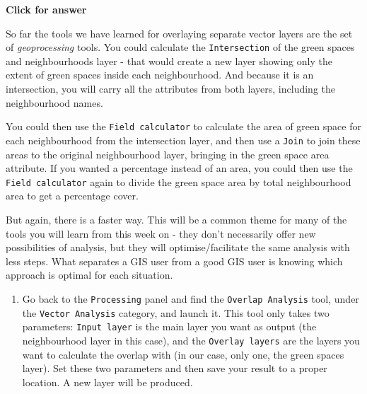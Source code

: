 \documentclass[
  letterpaper,
  DIV=11,
  numbers=noendperiod]{scrreprt}
\providecommand{\tightlist}{%
  \setlength{\itemsep}{0pt}\setlength{\parskip}{0pt}}\usepackage{longtable,booktabs,array}
\begin{document}
\begin{tcolorbox}[enhanced jigsaw, leftrule=.75mm, colframe=quarto-callout-important-color-frame, breakable, toprule=.15mm, bottomrule=.15mm, arc=.35mm, rightrule=.15mm, opacityback=0, colback=white, left=2mm]

\vspace{-3mm}\textbf{Click for answer}\vspace{3mm}

So far the tools we have learned for overlaying separate vector layers
are the set of \emph{geoprocessing} tools. You could calculate the
\texttt{Intersection} of the green spaces and neighbourhoods layer -
that would create a new layer showing only the extent of green spaces
inside each neighbourhood. And because it is an intersection, you will
carry all the attributes from both layers, including the neighbourhood
names.

You could then use the \texttt{Field\ calculator} to calculate the area
of green space for each neighbourhood from the intersection layer, and
then use a \texttt{Join} to join these areas to the original
neighbourhood layer, bringing in the green space area attribute. If you
wanted a percentage instead of an area, you could then use the
\texttt{Field\ calculator} again to divide the green space area by total
neighbourhood area to get a percentage cover.

But again, there is a faster way. This will be a common theme for many
of the tools you will learn from this week on - they don't necessarily
offer new possibilities of analysis, but they will optimise/facilitate
the same analysis with less steps. What separates a GIS user from a good
GIS user is knowing which approach is optimal for each situation.

\end{tcolorbox}

\begin{enumerate}
\def\labelenumi{(\arabic{enumi})}
\setcounter{enumi}{329}
\tightlist
\item
  Go back to the \texttt{Processing} panel and find the
  \texttt{Overlap\ Analysis} tool, under the \texttt{Vector\ Analysis}
  category, and launch it. This tool only takes two parameters:
  \texttt{Input\ layer} is the main layer you want as output (the
  neighbourhood layer in this case), and the \texttt{Overlay\ layers}
  are the layers you want to calculate the overlap with (in our case,
  only one, the green spaces layer). Set these two parameters and then
  save your result to a proper location. A new layer will be produced.
\end{enumerate}
\end{document}

